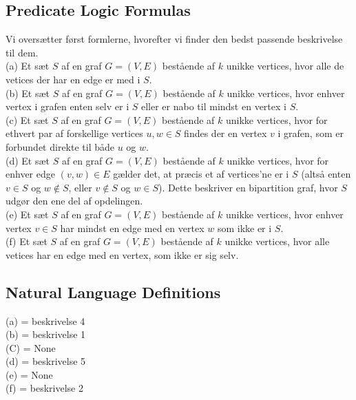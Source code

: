 \documentclass[a4paper,12pt]{article}
\begin{document}
\subsection{Predicate Logic Formulas}
Vi oversætter først formlerne, hvorefter vi finder den bedst passende beskrivelse til dem.\\

(a) Et sæt $S$ af en graf $G=(V,E)$ bestående af $k$ unikke vertices, hvor alle de vetices der har en edge er med i $S$.\\

(b) Et sæt $S$ af en graf $G=(V,E)$ bestående af $k$ unikke vertices, hvor enhver vertex i grafen enten selv er i $S$ eller er nabo til mindst en vertex i $S$.\\

(c) Et sæt $S$ af en graf $G=(V,E)$ bestående af $k$ unikke vertices, hvor for ethvert par af forskellige vertices $u,w \in S$ findes der en vertex $v$ i grafen, som er forbundet direkte til både $u$ og $w$.\\

(d) Et sæt $S$ af en graf $G=(V,E)$ bestående af $k$ unikke vertices, hvor for enhver edge $(v,w) \in E$ gælder det, at præcis et af vertices'ne er i $S$ (altså enten $v \in S$ og $w \notin S$, eller $v \notin S$ og $w \in S$). Dette beskriver en bipartition graf, hvor $S$ udgør den ene del af opdelingen.\\

(e) Et sæt $S$ af en graf $G=(V,E)$ bestående af $k$ unikke vertices, hvor enhver vertex $v \in S$ har mindst en edge med en vertex $w$ som ikke er i $S$.\\

(f) Et sæt $S$ af en graf $G=(V,E)$ bestående af $k$ unikke vertices, hvor alle vetices har en edge med en vertex, som ikke er sig selv.\\

\subsection{Natural Language Definitions}
(a) = beskrivelse 4\\
(b) = beskrivelse 1\\
(C) = None\\
(d) = beskrivelse 5\\
(e) = None\\
(f) = beskrivelse 2
\end{document}
